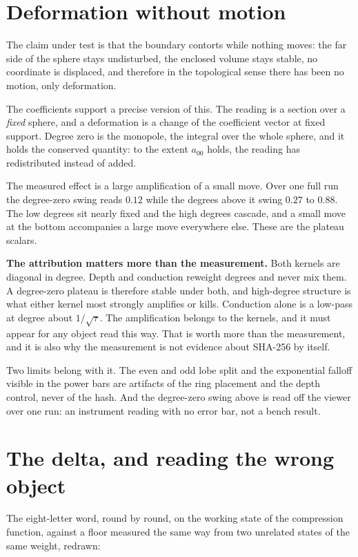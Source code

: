 \section{Deformation without motion}

The claim under test is that the boundary contorts while nothing moves: the far side of the sphere stays undisturbed, the enclosed volume stays stable, no coordinate is displaced, and therefore in the topological sense there has been no motion, only deformation.

The coefficients support a precise version of this. The reading is a section over a \emph{fixed} sphere, and a deformation is a change of the coefficient vector at fixed support. Degree zero is the monopole, the integral over the whole sphere, and it holds the conserved quantity: to the extent \(a_{00}\) holds, the reading has redistributed instead of added.

The measured effect is a large amplification of a small move. Over one full run the degree-zero swing reads \(0.12\) while the degrees above it swing \(0.27\) to \(0.88\). The low degrees sit nearly fixed and the high degrees cascade, and a small move at the bottom accompanies a large move everywhere else. These are the plateau scalars.

\textbf{The attribution matters more than the measurement.} Both kernels are diagonal in degree. Depth and conduction reweight degrees and never mix them. A degree-zero plateau is therefore stable under both, and high-degree structure is what either kernel most strongly amplifies or kills. Conduction alone is a low-pass at degree about \(1/\sqrt{\tau}\). The amplification belongs to the kernels, and it must appear for any object read this way. That is worth more than the measurement, and it is also why the measurement is not evidence about SHA-256 by itself.

Two limits belong with it. The even and odd lobe split and the exponential falloff visible in the power bars are artifacts of the ring placement and the depth control, never of the hash. And the degree-zero swing above is read off the viewer over one run: an instrument reading with no error bar, not a bench result.

\section{The delta, and reading the wrong object}

The eight-letter word, round by round, on the working state of the compression function, against a floor measured the same way from two unrelated states of the same weight, redrawn:

